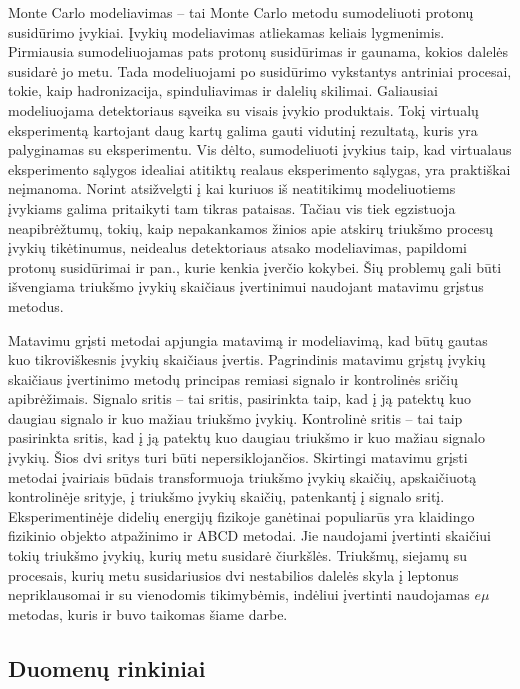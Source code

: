 \documentclass[a4paper, 12pt, twoside]{article}
\newcommand{\emu}{e\mu}
\begin{document}
Monte Carlo modeliavimas -- tai Monte Carlo metodu sumodeliuoti protonų susidūrimo įvykiai.
Įvykių modeliavimas atliekamas keliais lygmenimis.
Pirmiausia sumodeliuojamas pats protonų susidūrimas ir gaunama, kokios dalelės susidarė jo metu.
Tada modeliuojami po susidūrimo vykstantys antriniai procesai, tokie, kaip hadronizacija, spinduliavimas ir dalelių skilimai.
Galiausiai modeliuojama detektoriaus sąveika su visais įvykio produktais.
Tokį virtualų eksperimentą kartojant daug kartų galima gauti vidutinį rezultatą, kuris yra palyginamas su eksperimentu.
Vis dėlto, sumodeliuoti įvykius taip, kad virtualaus eksperimento sąlygos idealiai atitiktų realaus eksperimento sąlygas,
yra praktiškai neįmanoma.
Norint atsižvelgti į kai kuriuos iš neatitikimų modeliuotiems įvykiams galima pritaikyti tam tikras pataisas.
Tačiau vis tiek egzistuoja neapibrėžtumų, tokių, kaip nepakankamos žinios apie atskirų triukšmo procesų įvykių tikėtinumus,
neidealus detektoriaus atsako modeliavimas, papildomi protonų susidūrimai ir pan., kurie kenkia įverčio kokybei.
Šių problemų gali būti išvengiama triukšmo įvykių skaičiaus įvertinimui naudojant matavimu grįstus metodus.

Matavimu grįsti metodai apjungia matavimą ir modeliavimą, kad būtų gautas kuo tikroviškesnis įvykių skaičiaus įvertis.
Pagrindinis matavimu grįstų įvykių skaičiaus įvertinimo metodų principas remiasi signalo ir kontrolinės sričių apibrėžimais.
Signalo sritis -- tai sritis, pasirinkta taip, kad į ją patektų kuo daugiau signalo ir kuo mažiau triukšmo įvykių.
Kontrolinė sritis -- tai taip pasirinkta sritis, kad į ją patektų kuo daugiau triukšmo ir kuo mažiau signalo įvykių.
Šios dvi sritys turi būti nepersiklojančios.
Skirtingi matavimu grįsti metodai įvairiais būdais transformuoja triukšmo įvykių skaičių, apskaičiuotą kontrolinėje
srityje, į triukšmo įvykių skaičių, patenkantį į signalo sritį.
Eksperimentinėje didelių energijų fizikoje ganėtinai populiarūs yra klaidingo fizikinio objekto atpažinimo ir ABCD metodai.
Jie naudojami įvertinti skaičiui tokių triukšmo įvykių, kurių metu susidarė čiurkšlės.
Triukšmų, siejamų su procesais, kurių metu susidariusios dvi nestabilios dalelės skyla į leptonus nepriklausomai ir su
vienodomis tikimybėmis, indėliui įvertinti naudojamas $\emu$ metodas, kuris ir buvo taikomas šiame darbe.

\subsection{Duomenų rinkiniai}
\end{document}
